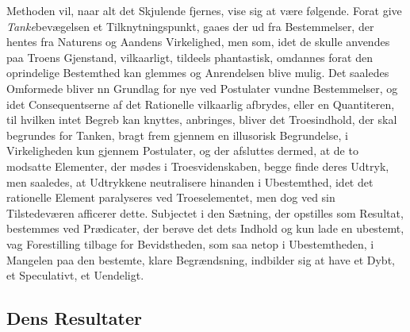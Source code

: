 \documentclass[12pt,a4paper]{book}
\begin{document}
Methoden vil, naar alt det Skjulende fjernes, vise sig at være følgende. Forat give \emph{Tanke}bevægelsen et Tilknytningspunkt, gaaes der ud fra Bestemmelser, der hentes fra
Naturens og Aandens Virkelighed, men som, idet de skulle anvendes paa Troens Gjenstand,
vilkaarligt, tildeels phantastisk, omdannes forat den oprindelige Bestemthed kan glemmes og
Anrendelsen blive mulig. Det saaledes Omformede bliver nn Grundlag for nye ved Postulater
vundne Bestemmelser, og idet Consequentserne af det Rationelle vilkaarlig afbrydes, eller
en Quantiteren, til hvilken intet Begreb kan knyttes, anbringes, bliver det Troesindhold,
der skal begrundes for Tanken, bragt frem gjennem en illusorisk Begrundelse, i
Virkeligheden kun gjennem Postulater, og der afsluttes dermed, at de to modsatte Elementer,
der mødes i Troesvidenskaben, begge finde deres Udtryk, men saaledes, at Udtrykkene
neutralisere hinanden i Ubestemthed, idet det rationelle Element paralyseres ved
Troeselementet, men dog ved sin Tilstedeværen afficerer dette. Subjectet i den Sætning, der
opstilles som Resultat, bestemmes ved Prædicater, der berøve det dets Indhold og kun lade
en ubestemt, vag Forestilling tilbage for Bevidstheden, som saa netop i Ubestemtheden, i
Mangelen paa den bestemte, klare Begrændsning, indbilder sig at have et Dybt, et
Speculativt, et Uendeligt.

\subsection{Dens Resultater}
\label{ssec:resultater}
\end{document}
